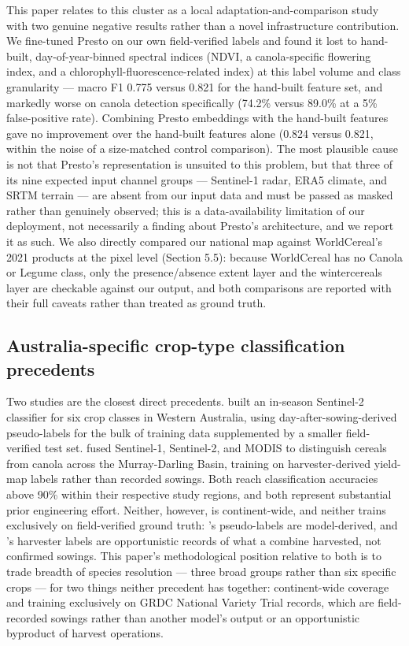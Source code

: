 This paper relates to this cluster as a local adaptation-and-comparison study with two genuine negative results rather than a novel infrastructure contribution. We fine-tuned Presto on our own field-verified labels and found it lost to hand-built, day-of-year-binned spectral indices (NDVI, a canola-specific flowering index, and a chlorophyll-fluorescence-related index) at this label volume and class granularity --- macro F1 0.775 versus 0.821 for the hand-built feature set, and markedly worse on canola detection specifically (74.2\% versus 89.0\% at a 5\% false-positive rate). Combining Presto embeddings with the hand-built features gave no improvement over the hand-built features alone (0.824 versus 0.821, within the noise of a size-matched control comparison). The most plausible cause is not that Presto's representation is unsuited to this problem, but that three of its nine expected input channel groups --- Sentinel-1 radar, ERA5 climate, and SRTM terrain --- are absent from our input data and must be passed as masked rather than genuinely observed; this is a data-availability limitation of our deployment, not necessarily a finding about Presto's architecture, and we report it as such. We also directly compared our national map against WorldCereal's 2021 products at the pixel level (Section 5.5): because WorldCereal has no Canola or Legume class, only the presence/absence extent layer and the wintercereals layer are checkable against our output, and both comparisons are reported with their full caveats rather than treated as ground truth.

\subsection{Australia-specific crop-type classification precedents}\label{australia-specific-crop-type-classification-precedents}

Two studies are the closest direct precedents. \citet{sharma2026wa} built an in-season Sentinel-2 classifier for six crop classes in Western Australia, using day-after-sowing-derived pseudo-labels for the bulk of training data supplemented by a smaller field-verified test set. \citet{alshammari2024mdb} fused Sentinel-1, Sentinel-2, and MODIS to distinguish cereals from canola across the Murray-Darling Basin, training on harvester-derived yield-map labels rather than recorded sowings. Both reach classification accuracies above 90\% within their respective study regions, and both represent substantial prior engineering effort. Neither, however, is continent-wide, and neither trains exclusively on field-verified ground truth: \citeauthor{sharma2026wa}'s pseudo-labels are model-derived, and \citeauthor{alshammari2024mdb}'s harvester labels are opportunistic records of what a combine harvested, not confirmed sowings. This paper's methodological position relative to both is to trade breadth of species resolution --- three broad groups rather than six specific crops --- for two things neither precedent has together: continent-wide coverage and training exclusively on GRDC National Variety Trial records, which are field-recorded sowings rather than another model's output or an opportunistic byproduct of harvest operations.

